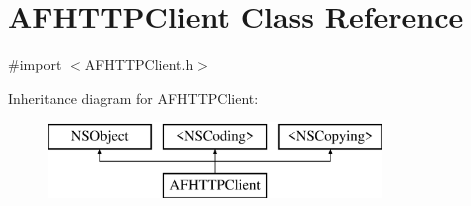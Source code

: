 \hypertarget{interface_a_f_h_t_t_p_client}{\section{A\-F\-H\-T\-T\-P\-Client Class Reference}
\label{interface_a_f_h_t_t_p_client}
}


{\ttfamily \#import $<$A\-F\-H\-T\-T\-P\-Client.\-h$>$}

Inheritance diagram for A\-F\-H\-T\-T\-P\-Client\-:\begin{figure}[H]
\begin{center}
\leavevmode
\includegraphics[height=2.000000cm]{interface_a_f_h_t_t_p_client}
\end{center}
\end{figure}
